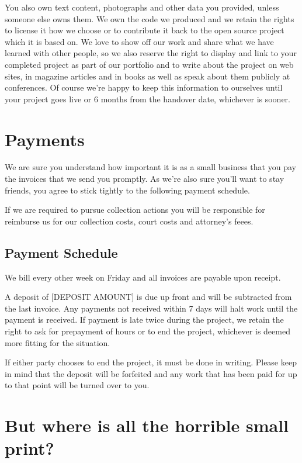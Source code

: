 \documentclass[10pt,a4paper,parskip]{scrartcl}
\begin{document}
You also own text content, photographs and other data you provided, unless
someone else owns them. We own the code we produced and we retain the rights to
license it how we choose or to contribute it back to the open source project
which it is based on.
We love to show off our work and share what we have learned with other people,
so we also reserve the right to display and link to your completed project as
part of our portfolio and to write about the project on web sites, in magazine
articles and in books as well as speak about them publicly at conferences. Of
course we’re happy to keep this information to ourselves until your project
goes live or 6 months from the handover date, whichever is sooner.

\section{Payments}

We are sure you understand how important it is as a small business that you pay
the invoices that we send you promptly.  As we're also sure you'll want to stay
friends, you agree to stick tightly to the following payment schedule.

If we are required to pursue collection actions you will be responsible for
reimburse us for our collection costs, court costs and attorney's feees.

\subsection{Payment Schedule}

We bill every other week on Friday and all invoices are payable upon receipt.

A deposit of [DEPOSIT AMOUNT] is due up front and will be subtracted from the
last invoice.
Any payments not received within 7 days will halt work until the payment is
received. If payment is late twice during the project, we retain the right to
ask for prepayment of hours or to end the project, whichever is deemed more
fitting for the situation.

If either party chooses to end the project, it must be done in writing. Please
keep in mind that the deposit will be forfeited and any work that has been paid
for up to that point will be turned over to you.

\section{But where is all the horrible small print?}
\end{document}
